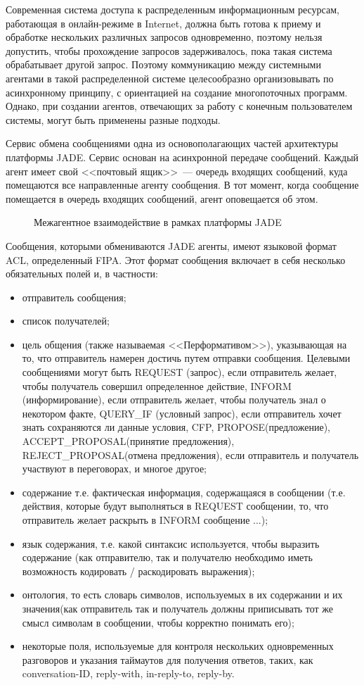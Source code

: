 Современная система доступа к распределенным информационным ресурсам, работающая в онлайн-режиме в Internet, должна быть готова к приему и обработке нескольких различных запросов одновременно, поэтому нельзя допустить, чтобы прохождение запросов задерживалось, пока такая система обрабатывает другой запрос. Поэтому коммуникацию между системными агентами в такой распределенной системе целесообразно организовывать по асинхронному принципу, с ориентацией на создание многопоточных программ. Однако, при создании агентов, отвечающих за работу с конечным пользователем системы, могут быть применены разные подходы.

Сервис обмена сообщениями одна из основополагающих частей архитектуры платформы JADE. Сервис основан на асинхронной передаче сообщений. Каждый агент имеет свой <<почтовый ящик>>~--- очередь входящих сообщений, куда помещаются все направленные агенту сообщения. В тот момент, когда сообщение помещается в очередь входящих сообщений, агент оповещается об этом.
\begin{figure}[h]
\caption{Межагентное взаимодействие в рамках платформы JADE}
\label{2:acl}
\end{figure}
Сообщения, которыми обмениваются JADE агенты, имеют языковой формат ACL, определенный FIPA. Этот формат сообщения включает в себя несколько обязательных полей и, в частности:
\begin{itemize}
\item отправитель сообщения;
\item список получателей;
\item цель общения (также называемая <<Перформативом>>), указывающая на то, что отправитель намерен достичь путем отправки сообщения. Целевыми сообщениями могут быть REQUEST (запрос), если отправитель желает, чтобы получатель совершил определенное действие, INFORM (информирование), если отправитель желает, чтобы получатель знал о некотором факте, QUERY\_IF (условный запрос), если отправитель хочет знать сохраняются ли данные условия, CFP, PROPOSE(предложение), ACCEPT\_PROPOSAL(принятие предложения), REJECT\_PROPOSAL(отмена предложения), если отправитель и получатель участвуют в переговорах, и многое другое; 
\item содержание т.е. фактическая информация, содержащаяся в сообщении (т.е. действия, которые будут выполняться в REQUEST сообщении, то, что отправитель желает раскрыть в INFORM сообщение ...);
\item язык содержания, т.е. какой синтаксис используется, чтобы выразить содержание (как отправителю, так и получателю необходимо иметь возможность кодировать / раскодировать выражения);
\item онтология, то есть словарь символов, используемых в их содержании и их значения(как отправитель так и получатель должны приписывать тот же смысл символам в сообщении, чтобы корректно понимать его);
\item некоторые поля, используемые для контроля нескольких одновременных разговоров и указания таймаутов для получения ответов, таких, как conversation-ID, reply-with, in-reply-to, reply-by. 
\end{itemize}

